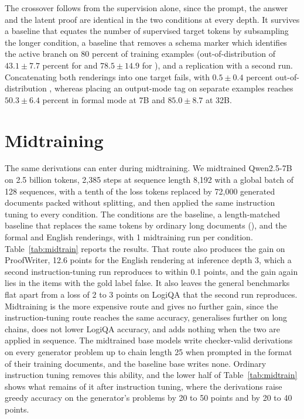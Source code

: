 

The crossover follows from the supervision alone, since the prompt, the
answer and the latent proof are identical in the two conditions at every
depth. It survives a baseline that equates the number of supervised target
tokens by subsampling the longer condition, a baseline that removes a schema
marker which identifies the active branch on 80 percent of training examples
(out-of-distribution  of $43.1\pm7.7$ percent for \formal{} and
$78.5\pm14.9$ for \nat{}), and a replication with a second run. Concatenating
both renderings into one target fails, with $0.5\pm0.4$ percent
out-of-distribution , whereas placing an output-mode tag on separate
examples reaches $50.3\pm6.4$ percent in formal mode at 7B and $85.0\pm8.7$
at 32B.

\section{Midtraining}
\label{sec:midtrain-detail}

The same derivations can enter during midtraining. We midtrained Qwen2.5-7B
on 2.5 billion tokens, 2{,}385 steps at sequence length 8{,}192 with a
global batch of 128 sequences, with a tenth of the loss tokens replaced by
72{,}000 generated documents packed without splitting, and then applied the
same instruction tuning to every condition. The conditions are the baseline,
a length-matched baseline that replaces the same tokens by ordinary long
documents (\longdoc{}), and the formal and English renderings, with 1
midtraining run per condition. Table~\ref{tab:midtrain} reports the
results. That route also produces the gain on ProofWriter, 12.6 points for
the English rendering at inference depth 3, which a second instruction-tuning
run reproduces to within 0.1 points, and the gain again lies in the items
with the gold label false. It also leaves the general benchmarks flat apart
from a loss of 2 to 3 points on LogiQA that the second run reproduces.
Midtraining is the more expensive route and gives no further gain, since the
instruction-tuning route reaches the same accuracy, generalises further on
long chains, does not lower LogiQA accuracy, and adds nothing when the two are
applied in sequence. The midtrained base models write checker-valid
derivations on every generator problem up to chain length 25 when prompted
in the format of their training documents, and the baseline base writes
none. Ordinary instruction tuning removes this ability, and the lower half
of Table~\ref{tab:midtrain} shows what remains of it after instruction
tuning, where the derivations raise greedy accuracy on the generator's
problems by 20 to 50 points and  by 20 to 40 points.

